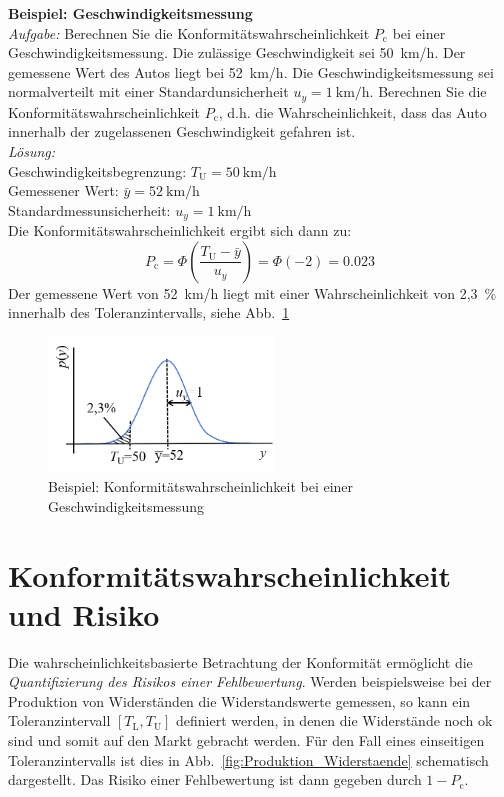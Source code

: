 \textbf{Beispiel: Geschwindigkeitsmessung} \\
\textsl{Aufgabe:} Berechnen Sie die Konformitätswahrscheinlichkeit $P_\mathrm{c}$ bei einer
Geschwindigkeitsmessung. Die zulässige Geschwindigkeit sei 50~km/h. Der gemessene Wert des Autos liegt bei 52~km/h. Die Geschwindigkeitsmessung sei normalverteilt mit einer Standardunsicherheit $u_y= 1~\mathrm{km/h}$. Berechnen Sie die Konformitätswahrscheinlichkeit
$P_\mathrm{c}$, d.h. die Wahrscheinlichkeit, dass das Auto innerhalb der zugelassenen Geschwindigkeit gefahren ist. \\
\textsl{Lösung:} \\
Geschwindigkeitsbegrenzung: $T_\mathrm{U} = 50~\textrm{km/h}$\\
Gemessener Wert: $\bar y = 52~\textrm{km/h}$ \\
Standardmessunsicherheit: $u_y = 1~\textrm{km/h} $ \\
Die Konformitätswahrscheinlichkeit ergibt sich dann zu:
\[
P_\mathrm{c} = \Phi \left( \frac{T_\mathrm{U}-\bar y}{u_y}\right) = \Phi(-2) = 0.023
\]
Der gemessene Wert von 52~km/h liegt mit einer Wahrscheinlichkeit von 2,3~\% innerhalb des To\-le\-ranz\-inter\-valls, siehe Abb.~\ref{fig:LoesungGeschwindigekeitsmessung}
\begin{figure}[!htp]
	\begin{center}
		\includegraphics[width=60mm]{05_vorlesung/media/Bsp_Geschwindigkeitsmessung.png}
		\caption{\label{fig:LoesungGeschwindigekeitsmessung} Beispiel: Konformitätswahrscheinlichkeit bei einer Geschwindigkeitsmessung}
	\end{center}
\end{figure}

\section{Konformitätswahrscheinlichkeit und Risiko}
Die wahrscheinlichkeitsbasierte Betrachtung der Konformität ermöglicht die \textsl{Quantifizierung des Risikos einer Fehlbewertung}. Werden beispielsweise bei der Produktion von Widerständen die Widerstandswerte gemessen, so kann ein Toleranzintervall $[T_\mathrm{L}, T_\mathrm{U}]$ definiert werden, in denen die Widerstände noch ok sind und somit auf den Markt gebracht werden. Für den Fall eines einseitigen Toleranzintervalls ist dies in Abb.~\ref{fig:Produktion_Widerstaende} schematisch
dargestellt. Das Risiko einer Fehlbewertung ist dann gegeben durch $1- P_\mathrm{c}$.\\

